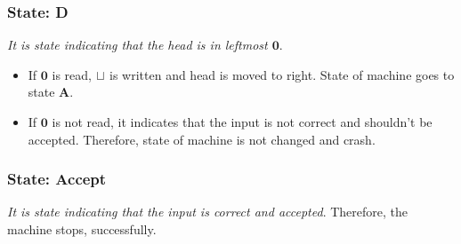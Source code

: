 \subsubsection*{State: D}
\label{q1-state:D}

\textit{It is state indicating that the head is in leftmost $\mathbf{0}$}. 
\begin{itemize}
  \item If $\mathbf{0}$ is read, $\sqcup$ is written and head is moved to right. State of machine goes to state \hyperref[q1-state:A]{$\mathbf{A}$}.
  \item If $\mathbf{0}$ is not read, it indicates that the input is not correct and shouldn't be accepted. Therefore, state of machine is not changed and crash.
\end{itemize}

\subsubsection*{State: Accept}
\label{q1-state:Accept}

\textit{It is state indicating that the input is correct and accepted}. Therefore, the machine stops, successfully.